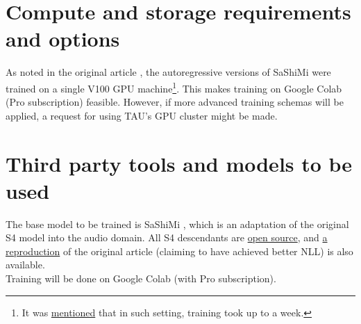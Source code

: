 \documentclass[12pt]{article}
\begin{document}
\section{Compute and storage requirements and options}\label{marker}
As noted in the original article \cite{goel2022itsrawaudiogeneration}, the autoregressive versions of SaShiMi were trained on a single V100 GPU machine\footnote[1]{It was \href{https://github.com/state-spaces/s4/blob/main/models/sashimi/README.md}{mentioned} that in such setting, training took up to a week.}. This makes training on Google Colab (Pro subscription) feasible.
However, if more advanced training schemas will be applied, a request for using TAU's GPU cluster might be made.

\section{Third party tools and models to be used}

The base model to be trained is SaShiMi \cite{goel2022itsrawaudiogeneration}, which is an adaptation of the original S4 model \cite{gu2022efficientlymodelinglongsequences} into the audio domain. 
All S4 descendants are \href{https://github.com/state-spaces/s4/tree/main}{open source}, and \href{https://huggingface.co/necrashter/SaShiMi-796}{a reproduction} of the original article (claiming to have achieved better NLL) is also available.
\\
Training will be done on Google Colab (with Pro subscription).


\end{document}
